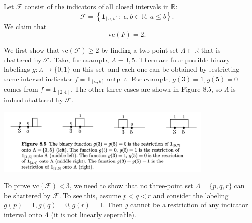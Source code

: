 \begin{example}[Intervals]
\label{ex:8.3.2}
Let $\mathcal{F}$ consist of the indicators of all closed intervals in $\mathbb{R}$:
\[ \mathcal{F} = \left\{ \mathbf{1}_{[a, b]}: \ a, b \in \mathbb{R}, \ a \leq b \right\}. \]
We claim that 
\[ \mathrm{vc}(F) = 2. \]

We first show that $\mathrm{vc}(\mathcal{F}) \geq 2$ by finding a two-point set $\Lambda \subset \mathbb{R}$ 
that is shattered by $\mathcal{F}$. Take, for example, $\Lambda = 3, 5$. There are four possible binary 
labelings $g: \Lambda \to \{0, 1\}$ on this set, and each one can be obtained by restricting some interval 
indicator $f = \mathbf{1}_{[a, b]}$ ontp $\Lambda$. For example, $g(3) = 1, g(5) = 0$ comes from 
$f = \mathbf{1}_{[2, 4]}$. The other three cases are shown in Figure 8.5, so $\Lambda$ is indeed shattered by 
$\mathcal{F}$.

\begin{center}
    \includegraphics[width=0.8\textwidth]{Chapter 8/fig8-5.png}
\end{center}

To prove $\mathrm{vc}(\mathcal{F}) < 3$, we need to show that no three-point set $\Lambda = \{p, q, r\}$ can 
be shattered by $\mathcal{F}$. To see this, assume $p < q < r$ and consider the labeling $g(p) = 1, g(q) = 0, 
g(r) = 1$. Then $g$ cannot be a restriction of any indicator interval onto $\Lambda$ (it is not linearly 
seperable).
\end{example}

